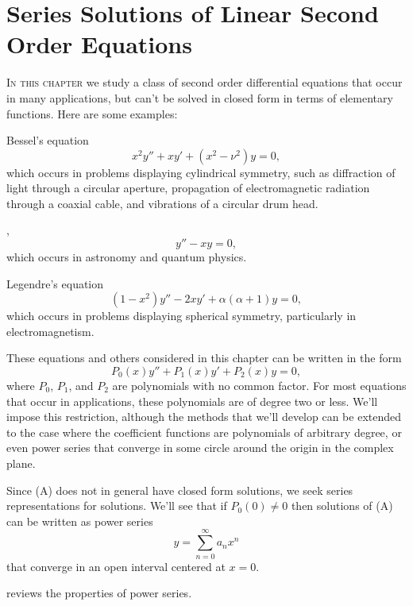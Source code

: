 
\chapter{Series Solutions of Linear Second Order Equations}\label{ch:series}

\textsc{In this chapter} we study a class of second order differential
equations that occur in many applications, but can't be solved in
closed form in terms of elementary functions. Here are some examples:

\begin{enumext}[label=\arabic*,wrap-label={(#1)},list-indent=0pt,labelwidth=1.5em]
\item
 Bessel's equation
\[
x^2y''+xy'+(x^2-\nu^2)y=0,
\]
which occurs in problems displaying cylindrical symmetry, such as
diffraction of light through a circular aperture, propagation of
electromagnetic radiation through a coaxial cable, and
vibrations of a circular drum head.

\item
{},
\[
y''-xy=0,
\]
which occurs in astronomy and quantum physics.

\item
Legendre's  equation
\[
(1-x^2)y''-2xy'+\alpha(\alpha+1)y=0,
\]
which occurs in problems displaying spherical symmetry, particularly
in electromagnetism.
\end{enumext}
%
These equations and  others   considered in this
chapter can be written in the form
\[
P_0(x)y''+P_1(x)y'+P_2(x)y=0, \tag{A}
\]
where $P_0$, $P_1$, and $P_2$ are polynomials with no common
factor. For most
 equations that occur in applications, these polynomials are of
degree two or less.  We'll impose this restriction, although the
methods that we'll develop can be extended to the case where the
coefficient functions are polynomials of arbitrary degree, or even
power series that converge in some circle around the origin in the
complex plane.

Since (A) does not in general have closed form solutions,
we seek series
representations for solutions. We'll see that if $P_0(0)\ne0$
then solutions of (A) can be written as power series
\[
y=\sum_{n=0}^\infty a_nx^n
\]
that converge in an open interval centered at $x=0$.

\vspace{.7in}
\noindent
{} reviews the properties of power series.


